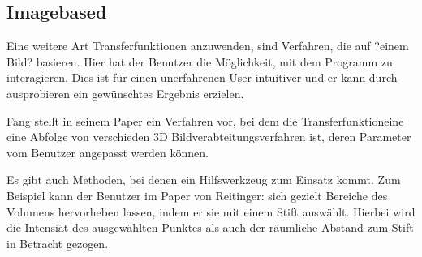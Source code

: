 \subsection{Imagebased}
Eine weitere Art Transferfunktionen anzuwenden, sind Verfahren, die auf ?einem Bild? basieren. Hier hat der Benutzer die Möglichkeit, mit dem Programm zu interagieren. Dies ist für einen unerfahrenen User intuitiver und er kann durch ausprobieren ein gewünschtes Ergebnis erzielen.

Fang stellt in seinem Paper \cite{fang1998image} ein Verfahren vor, bei dem die  Transferfunktioneine eine Abfolge von verschieden 3D Bildverabteitungsverfahren ist, deren Parameter vom Benutzer angepasst werden können.

Es gibt auch Methoden, bei denen ein Hilfswerkzeug zum Einsatz kommt. Zum Beispiel kann der Benutzer im Paper von Reitinger: \cite{reitinger2004user} sich gezielt Bereiche des Volumens hervorheben lassen, indem er sie mit einem Stift auswählt. Hierbei wird die Intensiät des ausgewählten Punktes als auch der räumliche Abstand zum Stift in Betracht gezogen.






























































